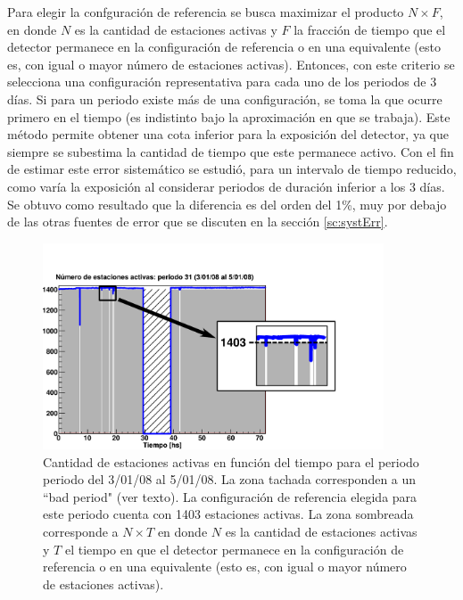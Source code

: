 	Para elegir la confguración de referencia se busca maximizar el producto $N \times F$, en donde $N$ es la cantidad de estaciones activas y $F$ la fracción de tiempo que el detector permanece en la configuración de referencia o en una equivalente (esto es, con igual o mayor número de estaciones activas).
	Entonces, con este criterio se selecciona una configuración representativa para cada uno de los periodos de 3 días.
	Si para un periodo existe más de una configuración, se toma la que ocurre primero en el tiempo (es indistinto bajo la aproximación en que se trabaja).
	Este método permite obtener una cota inferior para la exposición del detector, ya que siempre se subestima la cantidad de tiempo que este permanece activo.
	Con el fin de estimar este error sistemático se estudió, para un intervalo de tiempo reducido, como varía la exposición al considerar periodos de duración inferior a los 3 días. Se obtuvo como resultado que la diferencia es del orden del 1\%, muy por debajo de las otras fuentes de error que se discuten en la sección \ref{sc:systErr}.
	\begin{figure}[ht!]
	\begin{center}
	\includegraphics [width=0.90\textwidth]{fig/resultadosAuger/t2FilePlot.pdf}
	\caption{Cantidad de estaciones activas en función del tiempo para el periodo periodo del 3/01/08 al 5/01/08. La zona tachada corresponden a un ``bad period" (ver texto). La configuración de referencia elegida para este periodo cuenta con 1403 estaciones activas.
	La zona sombreada corresponde a $N \times T$ en donde $N$ es la cantidad de estaciones activas y $T$ el tiempo en que el detector permanece en la configuración de referencia o en una equivalente (esto es, con igual o mayor número de estaciones activas).}
	\label{fig:t2FilePlot}
	\end{center}
	\end{figure}
	
